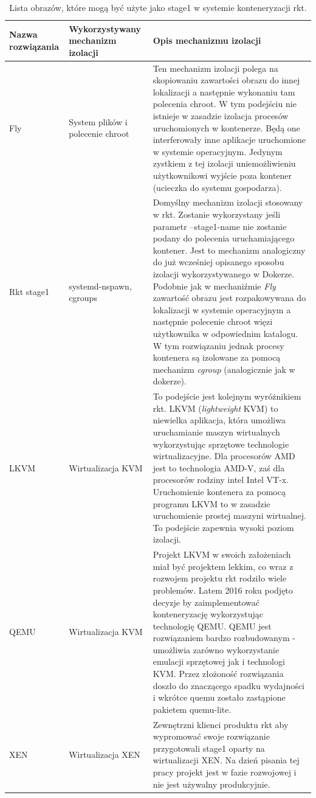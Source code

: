 \documentclass[10pt,a4paper,titlepage,twoside]{report}
\begin{document}
\begin{table}[!htbp]
\caption{Lista obrazów, które mogą być użyte jako stage1 w systemie konteneryzacji rkt.}
\label{rkt_flavors}
\centering
\begin{tabular}{|p{3cm}|p{3cm}|p{8cm}|}
  \hline
  \textbf{Nazwa rozwiązania} & \textbf{Wykorzystywany mechanizm izolacji} & \textbf{Opis mechanizmu izolacji}\\
  \hline
  Fly & System plików i polecenie chroot & Ten mechanizm izolacji polega na skopiowaniu zawartości obrazu do innej lokalizacji a następnie wykonaniu tam polecenia chroot. W tym podejściu nie istnieje w zasadzie izolacja procesów uruchomionych w kontenerze. Będą one interferowały inne aplikacje uruchomione w systemie operacyjnym. Jedynym zystkiem z tej izolacji uniemożliwieniu użytkownikowi wyjście poza kontener (ucieczka do systemu gospodarza). \\
  \hline
  Rkt stage1 & systemd-nspawn, cgroups & Domyślny mechanizm izolacji stosowany w rkt. Zostanie wykorzystany jeśli parametr --stage1-name nie zostanie podany do polecenia uruchamiającego kontener. Jest to mechanizm analogiczny do już wcześniej opisanego sposobu izolacji wykorzystywanego w Dokerze. Podobnie jak w mechaniźmie \textit{Fly} zawartość obrazu jest rozpakowywana do lokalizacji w systemie operacyjnym a następnie polecenie chroot więzi użytkownika w odpowiednim katalogu. W tym rozwiązaniu jednak procesy kontenera są izolowane za pomocą mechanizm \textit{cgroup} (analogicznie jak w dokerze). \\
  \hline
  LKVM & Wirtualizacja KVM & To podejście jest kolejnym wyróżnikiem rkt. LKVM (\textit{lightweight} KVM) to niewielka aplikacja, która umożliwa uruchamianie maszyn wirtualnych wykorzystując sprzętowe technologie wirtualizacyjne. Dla procesorów AMD jest to technologia AMD-V, zaś dla procesorów rodziny intel Intel VT-x. Uruchomienie kontenera za pomocą programu LKVM to w zasadzie uruchomienie prostej maszyni wirtualnej. To podejście zapewnia wysoki poziom izolacji. \\
  \hline
  QEMU & Wirtualizacja KVM & Projekt LKVM w swoich założeniach miał być projektem lekkim, co wraz z rozwojem projektu rkt rodziło wiele problemów. Latem 2016 roku podjęto decyzje by zaimplementować konteneryzację wykorzystując technologię QEMU. QEMU jest rozwiązaniem bardzo rozbudowanym - umożliwia zarówno wykorzystanie emulacji sprzętowej jak i technologi KVM. Przez złożoność rozwiązania doszło do znaczącego spadku wydajności i wkrótce quemu zostało zastąpione pakietem quemu-lite. \\
  \hline
  XEN & Wirtualizacja XEN & Zewnętrzni klienci produktu rkt aby wypromować swoje rozwiązanie przygotowali stage1 oparty na wirtualizacji XEN. Na dzień pisania tej pracy projekt jest w fazie rozwojowej i nie jest używalny produkcyjnie. \\
  \hline
\end{tabular}
\end{table}
\end{document}
